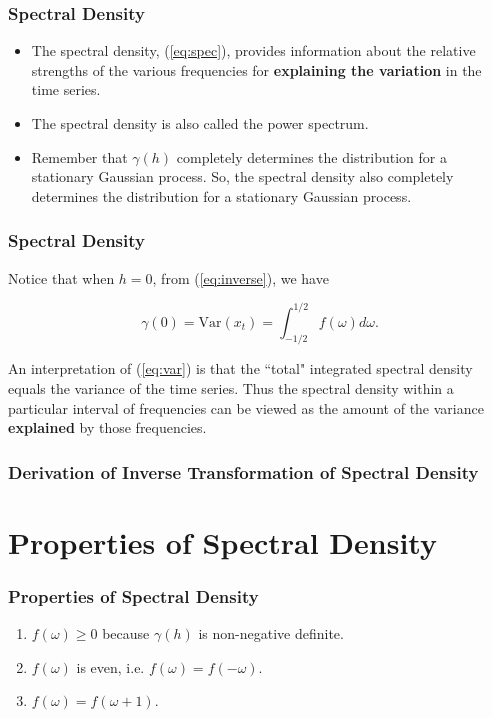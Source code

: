 \documentclass[%
xcolor=pdftex]{beamer}
\begin{document}
\begin{frame}
\frametitle{Spectral Density}

\begin{itemize}
\item The spectral density, (\ref{eq:spec}), provides information about the relative strengths of the various frequencies for \textbf{explaining the variation} in the time series.
\item The spectral density is also called the power spectrum.  
\item Remember
that $\gamma(h)$ completely determines the distribution for a
stationary Gaussian process.  So, the spectral density also
completely determines the distribution for a
stationary Gaussian process.
\end{itemize}

\end{frame}

\begin{frame}
\frametitle{Spectral Density}


Notice that when $h=0$, from (\ref{eq:inverse}), we have

\begin{equation} \label{eq:var}
\gamma(0) = \mbox{Var}(x_t) = \int^{1/2}_{-1/2} f(\omega) d\omega.
\end{equation}

An interpretation of (\ref{eq:var}) is that the ``total" integrated spectral density equals the variance of the time series.  Thus the spectral density within a particular interval of frequencies can be viewed as the amount of the variance \textbf{explained} by those frequencies.

\end{frame}


\begin{frame}
\frametitle{Derivation of Inverse Transformation of Spectral Density}

\end{frame}



\section{Properties of Spectral Density}
\frame{\tableofcontents[currentsection]}

\begin{frame}
\frametitle{Properties of Spectral Density}

\begin{enumerate}
\item $f(\omega) \geq 0$ because $\gamma(h)$ is non-negative definite.
\item $f(\omega)$ is even, i.e. $f(\omega) = f(-\omega)$.
\item $f(\omega) = f(\omega+1)$.
\end{enumerate}



\end{frame}
\end{document}
